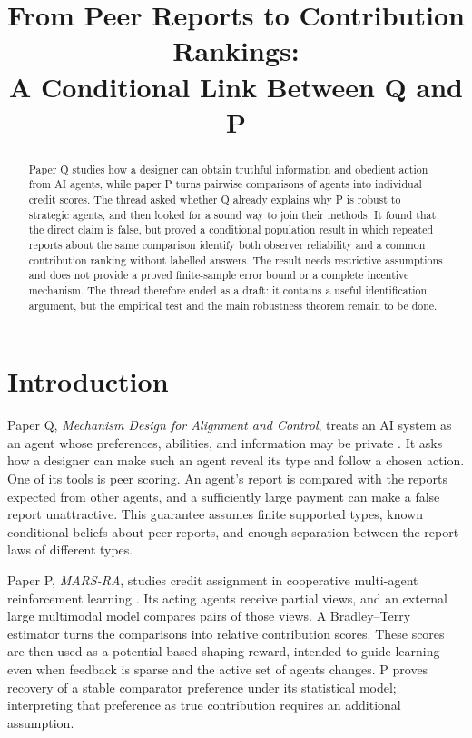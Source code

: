 \documentclass{article}
\title{From Peer Reports to Contribution Rankings:\\A Conditional Link Between Q and P}
\author{}
\date{}
\begin{document}
\maketitle

\begin{abstract}
Paper Q studies how a designer can obtain truthful information and obedient action from AI agents, while paper P turns pairwise comparisons of agents into individual credit scores.  The thread asked whether Q already explains why P is robust to strategic agents, and then looked for a sound way to join their methods.  It found that the direct claim is false, but proved a conditional population result in which repeated reports about the same comparison identify both observer reliability and a common contribution ranking without labelled answers.  The result needs restrictive assumptions and does not provide a proved finite-sample error bound or a complete incentive mechanism.  The thread therefore ended as a draft: it contains a useful identification argument, but the empirical test and the main robustness theorem remain to be done.
\end{abstract}

\section{Introduction}

Paper Q, \emph{Mechanism Design for Alignment and Control}, treats an AI system as an agent whose preferences, abilities, and information may be private \cite{Q}.  It asks how a designer can make such an agent reveal its type and follow a chosen action.  One of its tools is peer scoring.  An agent's report is compared with the reports expected from other agents, and a sufficiently large payment can make a false report unattractive.  This guarantee assumes finite supported types, known conditional beliefs about peer reports, and enough separation between the report laws of different types.

Paper P, \emph{MARS-RA}, studies credit assignment in cooperative multi-agent reinforcement learning \cite{P}.  Its acting agents receive partial views, and an external large multimodal model compares pairs of those views.  A Bradley--Terry estimator turns the comparisons into relative contribution scores.  These scores are then used as a potential-based shaping reward, intended to guide learning even when feedback is sparse and the active set of agents changes.  P proves recovery of a stable comparator preference under its statistical model; interpreting that preference as true contribution requires an additional assumption.
\end{document}
